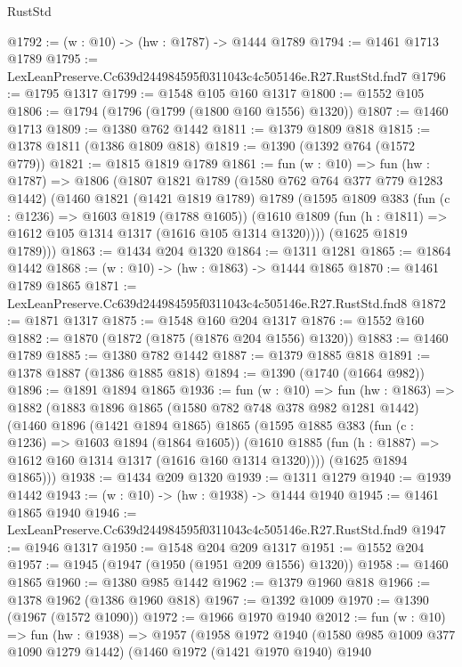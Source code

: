 \begin{lexlean}{RustStd}
\begin{coremodule}
@1792 := (w : @10) -> (hw : @1787) -> @1444 @1789
@1794 := @1461 @1713 @1789
@1795 := LexLeanPreserve.Cc639d244984595f0311043c4c505146e.R27.RustStd.fnd7
@1796 := @1795 @1317
@1799 := @1548 @105 @160 @1317
@1800 := @1552 @105
@1806 := @1794 (@1796 (@1799 (@1800 @160 @1556) @1320))
@1807 := @1460 @1713
@1809 := @1380 @762 @1442
@1811 := @1379 @1809 @818
@1815 := @1378 @1811 (@1386 @1809 @818)
@1819 := @1390 (@1392 @764 (@1572 @779))
@1821 := @1815 @1819 @1789
@1861 := fun (w : @10) =>
  fun (hw : @1787) =>
  @1806
    (@1807
      @1821
      @1789
      (@1580 @762 @764 @377 @779 @1283 @1442)
      (@1460
        @1821
        (@1421 @1819 @1789)
        @1789
        (@1595
          @1809
          @383
          (fun (c : @1236) => @1603 @1819 (@1788 @1605))
          (@1610 @1809 (fun (h : @1811) => @1612 @105 @1314 @1317 (@1616 @105 @1314 @1320))))
        (@1625 @1819 @1789)))
@1863 := @1434 @204 @1320
@1864 := @1311 @1281
@1865 := @1864 @1442
@1868 := (w : @10) -> (hw : @1863) -> @1444 @1865
@1870 := @1461 @1789 @1865
@1871 := LexLeanPreserve.Cc639d244984595f0311043c4c505146e.R27.RustStd.fnd8
@1872 := @1871 @1317
@1875 := @1548 @160 @204 @1317
@1876 := @1552 @160
@1882 := @1870 (@1872 (@1875 (@1876 @204 @1556) @1320))
@1883 := @1460 @1789
@1885 := @1380 @782 @1442
@1887 := @1379 @1885 @818
@1891 := @1378 @1887 (@1386 @1885 @818)
@1894 := @1390 (@1740 (@1664 @982))
@1896 := @1891 @1894 @1865
@1936 := fun (w : @10) =>
  fun (hw : @1863) =>
  @1882
    (@1883
      @1896
      @1865
      (@1580 @782 @748 @378 @982 @1281 @1442)
      (@1460
        @1896
        (@1421 @1894 @1865)
        @1865
        (@1595
          @1885
          @383
          (fun (c : @1236) => @1603 @1894 (@1864 @1605))
          (@1610 @1885 (fun (h : @1887) => @1612 @160 @1314 @1317 (@1616 @160 @1314 @1320))))
        (@1625 @1894 @1865)))
@1938 := @1434 @209 @1320
@1939 := @1311 @1279
@1940 := @1939 @1442
@1943 := (w : @10) -> (hw : @1938) -> @1444 @1940
@1945 := @1461 @1865 @1940
@1946 := LexLeanPreserve.Cc639d244984595f0311043c4c505146e.R27.RustStd.fnd9
@1947 := @1946 @1317
@1950 := @1548 @204 @209 @1317
@1951 := @1552 @204
@1957 := @1945 (@1947 (@1950 (@1951 @209 @1556) @1320))
@1958 := @1460 @1865
@1960 := @1380 @985 @1442
@1962 := @1379 @1960 @818
@1966 := @1378 @1962 (@1386 @1960 @818)
@1967 := @1392 @1009
@1970 := @1390 (@1967 (@1572 @1090))
@1972 := @1966 @1970 @1940
@2012 := fun (w : @10) =>
  fun (hw : @1938) =>
  @1957
    (@1958
      @1972
      @1940
      (@1580 @985 @1009 @377 @1090 @1279 @1442)
      (@1460
        @1972
        (@1421 @1970 @1940)
        @1940

\end{coremodule}
\end{lexlean}

